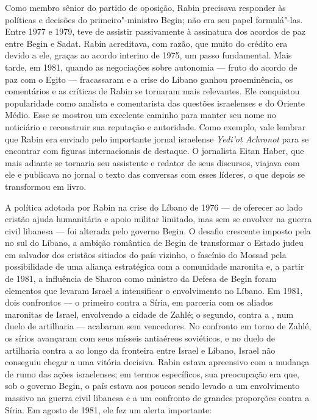 Como membro sênior do partido de oposição, Rabin precisava responder às
políticas e decisões do primeiro"-ministro Begin; não era seu papel
formulá"-las. Entre 1977 e 1979, teve de assistir passivamente à
assinatura dos acordos de paz entre Begin e Sadat. Rabin acreditava, com
razão, que muito do crédito era devido a ele, graças ao acordo interino
de 1975, um passo fundamental. Mais tarde, em 1981, quando as
negociações sobre autonomia --- fruto do acordo de paz com o Egito ---
fracassaram e a crise do Líbano ganhou proeminência, os comentários e as
críticas de Rabin se tornaram mais relevantes. Ele conquistou
popularidade como analista e comentarista das questões israelenses e do
Oriente Médio. Esse se mostrou um excelente caminho para manter seu nome
no noticiário e reconstruir sua reputação e autoridade. Como exemplo,
vale lembrar que Rabin era enviado pelo importante jornal israelense
\emph{Yedi'ot Achronot} para se encontrar com figuras internacionais de
destaque. O jornalista Eitan Haber, que mais adiante se tornaria seu
assistente e redator de seus discursos, viajava com ele e publicava no
jornal o texto das conversas com esses líderes, o que depois se
transformou em livro.

A política adotada por Rabin na crise do Líbano de 1976
--- de oferecer ao lado cristão ajuda humanitária e apoio militar
limitado, mas sem se envolver na guerra civil libanesa --- foi alterada
pelo governo Begin. O desafio crescente imposto pela  no sul do
Líbano, a ambição romântica de Begin de transformar o Estado judeu em
salvador dos cristãos sitiados do país vizinho, o fascínio do Mossad
pela possibilidade de uma aliança estratégica com a comunidade maronita
e, a partir de 1981, a influência de Sharon como ministro da Defesa de
Begin foram elementos que levaram Israel a intensificar o envolvimento
no Líbano. Em 1981, dois confrontos --- o primeiro contra a Síria, em
parceria com os aliados maronitas de Israel, envolvendo a cidade de
Zahlé; o segundo, contra a , num duelo de artilharia --- acabaram sem
vencedores. No confronto em torno de Zahlé, os sírios avançaram com seus
mísseis antiaéreos soviéticos, e no duelo de artilharia contra a  ao
longo da fronteira entre Israel e Líbano, Israel não conseguiu chegar a
uma vitória decisiva. Rabin estava apreensivo com a mudança de rumo das
ações israelenses; em termos específicos, sua preocupação era que, sob o
governo Begin, o país estava aos poucos sendo levado a um envolvimento
massivo na guerra civil libanesa e a um confronto de grandes proporções
contra a Síria. Em agosto de 1981, ele fez um alerta importante:

